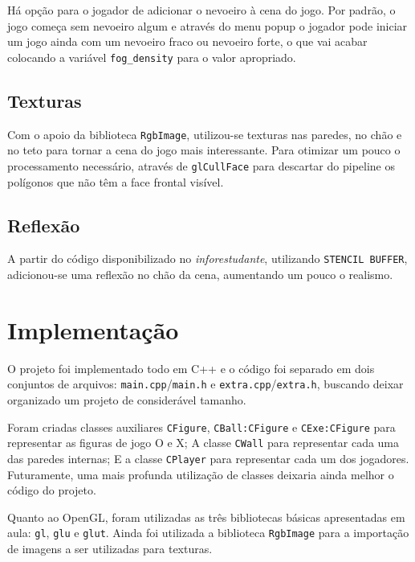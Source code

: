 \documentclass[12pt, onecolumn]{article}
\begin{document}
H\'a op\c{c}\~ao para o jogador de adicionar o nevoeiro \`a cena do jogo. Por padr\~ao, o jogo come\c{c}a sem nevoeiro algum e atrav\'es do menu popup o jogador pode iniciar um jogo ainda com um nevoeiro fraco ou nevoeiro forte, o que vai acabar colocando a vari\'avel \texttt{fog\_density} para o valor apropriado.

\subsection{Texturas}

Com o apoio da biblioteca \texttt{RgbImage}, utilizou-se texturas nas paredes, no ch\~ao e no teto para tornar a cena do jogo mais interessante. Para otimizar um pouco o processamento necess\'ario, atrav\'es de \texttt{glCullFace} para descartar do pipeline os pol\'igonos que n\~ao t\^em a face frontal vis\'ivel.

\subsection{Reflex\~ao}

A partir do c\'odigo disponibilizado no \textit{inforestudante}, utilizando \texttt{STENCIL BUFFER}, adicionou-se uma reflex\~ao no ch\~ao da cena, aumentando um pouco o realismo.

\twocolumn

\section{Implementa\c{c}\~ao}

O projeto foi implementado todo em C++ e o c\'odigo foi separado em dois conjuntos de arquivos: \texttt{main.cpp}/\texttt{main.h} e \texttt{extra.cpp}/\texttt{extra.h}, buscando deixar organizado um projeto de consider\'avel tamanho.

Foram criadas classes auxiliares \texttt{CFigure}, \break \texttt{CBall:CFigure} e \texttt{CExe:CFigure} para representar as figuras de jogo O e X; A classe \texttt{CWall} para representar cada uma das paredes internas; E a classe \texttt{CPlayer} para representar cada um dos jogadores. Futuramente, uma mais profunda utiliza\c{c}\~ao de classes deixaria ainda melhor o c\'odigo do projeto.

Quanto ao OpenGL, foram utilizadas as tr\^es bibliotecas b\'asicas apresentadas em aula: \texttt{gl}, \texttt{glu} e \texttt{glut}. Ainda foi utilizada a biblioteca \texttt{RgbImage} para a importa\c{c}\~ao de imagens a ser utilizadas para texturas.
\end{document}

